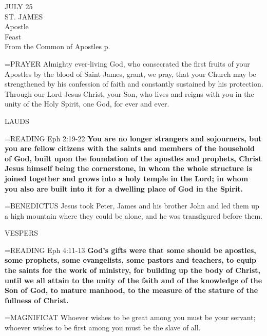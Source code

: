 \begin{center}\normalsize JULY 25\\
\footnotesize ST. JAMES\\
\footnotesize Apostle\\
\footnotesize Feast\\
\footnotesize From the Common of Apostles p. \\
\end{center}

\hangindent=\parindent \small{PRAYER 
Almighty ever-living God,
who consecrated the first fruits of your Apostles
by the blood of Saint James,
grant, we pray,
that your Church may be strengthened by his confession of faith
and constantly sustained by his protection.
Through our Lord Jesus Christ, your Son,
who lives and reigns with you in the unity of the Holy Spirit,
one God, for ever and ever.\\}
 
\begin{flushleft}\normalsize LAUDS\\\end{flushleft}

\hangindent=\parindent \small{READING} Eph 2:19-22 \textbf{You are no longer strangers and sojourners,
but you are fellow citizens with the saints and members of the
household of God, built upon the foundation of the apostles and
prophets, Christ Jesus himself being the cornerstone, in whom the
whole structure is joined together and grows into a holy temple in
the Lord; in whom you also are built into it for a dwelling place of
God in the Spirit.\\}
 
\hangindent=\parindent \small{BENEDICTUS  Jesus took Peter, James and his brother John and led
them up a high mountain where they could be alone, and he was
transfigured before them.\\}
 
\begin{flushleft}\normalsize VESPERS\\\end{flushleft}

\hangindent=\parindent \small{READING} Eph 4:11-13 \textbf{God’s gifts were that some should be apostles,
some prophets, some evangelists, some pastors and teachers, to
equip the saints for the work of ministry, for building up the body
of Christ, until we all attain to the unity of the faith and of the
knowledge of the Son of God, to mature manhood, to the measure
of the stature of the fullness of Christ.\\}
 
\hangindent=\parindent \small{MAGNIFICAT  Whoever wishes to be great among you must be your
servant; whoever wishes to be first among you must be the slave of
all.\\}
 
